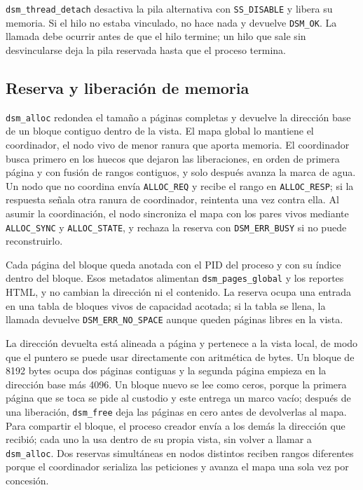 \texttt{dsm\_thread\_detach} desactiva la pila alternativa con \texttt{SS\_DISABLE} y libera su memoria. Si el hilo no estaba vinculado, no hace nada y devuelve \texttt{DSM\_OK}. La llamada debe ocurrir antes de que el hilo termine; un hilo que sale sin desvincularse deja la pila reservada hasta que el proceso termina.

\subsection{Reserva y liberación de memoria}

\texttt{dsm\_alloc} redondea el tamaño a páginas completas y devuelve la dirección base de un bloque contiguo dentro de la vista. El mapa global lo mantiene el coordinador, el nodo vivo de menor ranura que aporta memoria. El coordinador busca primero en los huecos que dejaron las liberaciones, en orden de primera página y con fusión de rangos contiguos, y solo después avanza la marca de agua. Un nodo que no coordina envía \texttt{ALLOC\_REQ} y recibe el rango en \texttt{ALLOC\_RESP}; si la respuesta señala otra ranura de coordinador, reintenta una vez contra ella. Al asumir la coordinación, el nodo sincroniza el mapa con los pares vivos mediante \texttt{ALLOC\_SYNC} y \texttt{ALLOC\_STATE}, y rechaza la reserva con \texttt{DSM\_ERR\_BUSY} si no puede reconstruirlo.

Cada página del bloque queda anotada con el PID del proceso y con su índice dentro del bloque. Esos metadatos alimentan \texttt{dsm\_pages\_global} y los reportes HTML, y no cambian la dirección ni el contenido. La reserva ocupa una entrada en una tabla de bloques vivos de capacidad acotada; si la tabla se llena, la llamada devuelve \texttt{DSM\_ERR\_NO\_SPACE} aunque queden páginas libres en la vista.

La dirección devuelta está alineada a página y pertenece a la vista local, de modo que el puntero se puede usar directamente con aritmética de bytes. Un bloque de 8192 bytes ocupa dos páginas contiguas y la segunda página empieza en la dirección base más 4096. Un bloque nuevo se lee como ceros, porque la primera página que se toca se pide al custodio y este entrega un marco vacío; después de una liberación, \texttt{dsm\_free} deja las páginas en cero antes de devolverlas al mapa. Para compartir el bloque, el proceso creador envía a los demás la dirección que recibió; cada uno la usa dentro de su propia vista, sin volver a llamar a \texttt{dsm\_alloc}. Dos reservas simultáneas en nodos distintos reciben rangos diferentes porque el coordinador serializa las peticiones y avanza el mapa una sola vez por concesión.

